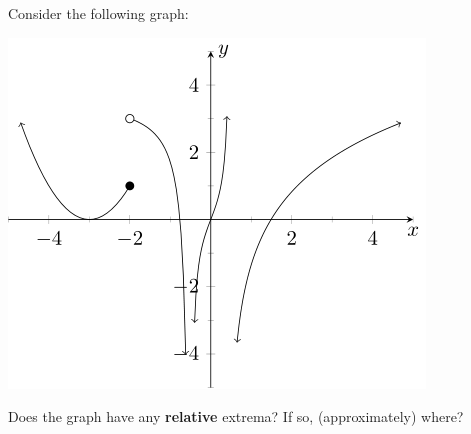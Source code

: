 \documentclass{ximera}
\begin{document}
\begin{problem}
    Consider the following graph:
    
    \begin{center}
        \includegraphics{./Picture14.png}
    \end{center}    
    
    Does the graph have any \textbf{relative} extrema? If so, (approximately) where?
    \begin{multipleChoice}
    \end{multipleChoice}
\end{problem}
\end{document}
